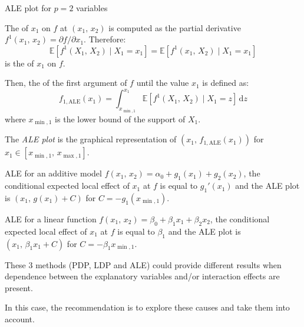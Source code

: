\begin{definition}{ALE plot}{} for $p = 2$ variables

	The  of $x_1$ on $f$ at $(x_1,\,x_2)$ is computed as the partial
	derivative $f^1(x_1,\,x_2) = \partial f/\partial x_1$. Therefore:
	\begin{equation*}
		\mathds E \left[
			f^1(X_1,\,X_2)
			\mid X_1 = x_1
			\right] = \mathds E \left[
			f^1(x_1,\,X_2) \mid X_1 = x_1
			\right]
	\end{equation*}
	is the  of $x_1$ on $f$.

	Then, the  of the first argument of $f$
	until the value $x_1$ is defined as:
	\begin{equation*}
		f_{1,\text{ALE}}(x_1) = \int_{x_{\min,1}}^{x_1} \mathds E \left[
			f^1(X_1,\,X_2)
			\mid X_1 = z
			\right] \, \mathrm d z
	\end{equation*}
	where $x_{\min,1}$ is the lower bound of the support of $X_1$.

	The \emph{ALE plot} is the graphical representation of
	$(x_1,\,f_{1,\text{ALE}}(x_1))$ for $x_1 \in [x_{\min,1},\,x_{\max,1}]$.

\end{definition}

\begin{example}{ALE for an additive model}{}
	$f(x_1,\,x_2) = \alpha_0 + g_1(x_1) + g_2(x_2)$, the
	conditional expected local effect of $x_1$ at $f$ is equal to $g_1'(x_1)$ and the
	ALE plot is $(x_1,\,g(x_1) + C)$ for $C = -g_1(x_{\min,1})$.
\end{example}

\begin{example}{ALE for a linear function}{}
	$f(x_1,\,x_2) = \beta_0 + \beta_1 x_1 + \beta_2 x_2$, the
	conditional expected local effect of $x_1$ at $f$ is equal to $\beta_1$ and the
	ALE plot is $(x_1,\,\beta_1 x_1 + C)$ for $C = -\beta_1 x_{\min,1}$.
\end{example}

\begin{note}
	These 3 methods (PDP, LDP and ALE) could provide
	different results when dependence between the explanatory variables
	and/or interaction effects are present.

	In this case, the recommendation is to explore these causes and take
	them into account.
\end{note}

